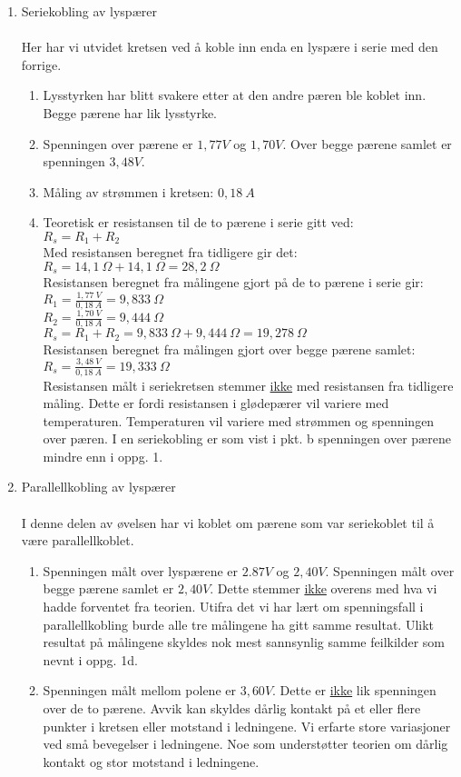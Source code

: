 \documentclass[norsk,11pt,a4paper]{report}
\newcommand{\oppgave}[2]{\item[#1:] #2}
\newcommand{\oppgaveDelStart}{\begin{enumerate}[leftmargin=*,itemsep=0.25cm,labelsep=1.5em,label=\alph*)]}
\newcommand{\oppgaveDelSlutt}{\end{enumerate}}
\newcommand{\oppgaveDel}[1]{\item[#1)]}
\begin{document}
\begin{enumerate}[itemsep=1cm]
\oppgave{2}{Seriekobling av lyspærer}\\\\
Her har vi utvidet kretsen ved å koble inn enda en lyspære i serie med den forrige.
\oppgaveDelStart
\oppgaveDel{a} Lysstyrken har blitt svakere etter at den andre pæren ble koblet inn. Begge pærene har lik lysstyrke.
\oppgaveDel{b} Spenningen over pærene er $1,77V$ og $1,70V$. Over begge pærene samlet er spenningen $3,48V$.
\oppgaveDel{c} Måling av strømmen i kretsen: $0,18\ A$
\oppgaveDel{d} Teoretisk er resistansen til de to pærene i serie gitt ved:\\[0.2cm]
$\boxed{R_s = R_1 + R_2}$\\[0.2cm]
Med resistansen beregnet fra tidligere gir det:\\[0.2cm]
$R_s = 14,1\ \Omega + 14,1\ \Omega = 28,2\ \Omega$\\[0.2cm]
Resistansen beregnet fra målingene gjort på de to pærene i serie gir:\\[0.2cm]
$R_1 = \frac{1,77\ V}{0,18\ A} = 9,833\ \Omega$\\[0.2cm]
$R_2 = \frac{1,70\ V}{0,18\ A} = 9,444\ \Omega$\\[0.2cm]
$R_s = R_1 + R_2 = 9,833\ \Omega + 9,444\ \Omega = 19,278\ \Omega$\\[0.2cm]
Resistansen beregnet fra målingen gjort over begge pærene samlet:\\[0.2cm]
$R_s = \frac{3,48\ V}{0,18\ A} = 19,333\ \Omega$\\[0.2cm]
Resistansen målt i seriekretsen stemmer \uline{ikke} med resistansen fra tidligere måling. Dette er fordi resistansen i glødepærer vil variere med temperaturen. Temperaturen vil variere med strømmen og spenningen over pæren. I en seriekobling er som vist i pkt. b spenningen over pærene mindre enn i oppg. 1.
\oppgaveDelSlutt

\oppgave{3}{Parallellkobling av lyspærer}\\\\
I denne delen av øvelsen har vi koblet om pærene som var seriekoblet til å være parallellkoblet.
\oppgaveDelStart
\oppgaveDel{a} Spenningen målt over lyspærene er $2.87V$ og $2,40V$. Spenningen målt over begge pærene samlet er $2,40V$. Dette stemmer \uline{ikke} overens med hva vi hadde forventet fra teorien. Utifra det vi har lært om spenningsfall i parallellkobling burde alle tre målingene ha gitt samme resultat. Ulikt resultat på målingene skyldes nok mest sannsynlig samme feilkilder som nevnt i oppg. 1d.
\oppgaveDel{b} Spenningen målt mellom polene er $3,60V$. Dette er \uline{ikke} lik spenningen over de to pærene. Avvik kan skyldes dårlig kontakt på et eller flere punkter i kretsen eller motstand i ledningene. Vi erfarte store variasjoner ved små bevegelser i ledningene. Noe som understøtter teorien om dårlig kontakt og stor motstand i ledningene.
\oppgaveDelSlutt


\end{enumerate}
\end{document}
